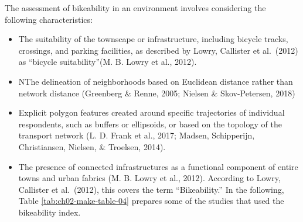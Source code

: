 \documentclass[
11pt, %
oneside, %
english, %
singlespacing, %
]{macthesis} %
\begin{document}
The assessment of bikeability in an environment involves considering the following characteristics:

\begin{itemize}
\item
  The suitability of the townscape or infrastructure, including bicycle tracks, crossings, and parking facilities, as described by Lowry, Callister et al.~(2012) as ``bicycle suitability''(M. B. Lowry et al., 2012).
\item
  NThe delineation of neighborhoods based on Euclidean distance rather than network distance (Greenberg \& Renne, 2005; Nielsen \& Skov-Petersen, 2018)
\item
  Explicit polygon features created around specific trajectories of individual respondents, such as buffers or ellipsoids, or based on the topology of the transport network (L. D. Frank et al., 2017; Madsen, Schipperijn, Christiansen, Nielsen, \& Troelsen, 2014).
\item
  The presence of connected infrastructures as a functional component of entire towns and urban fabrics (M. B. Lowry et al., 2012). According to Lowry, Callister et al.~(2012), this covers the term ``Bikeability.'' In the following, Table \ref{tab:ch02-make-table-04} prepares some of the studies that used the bikeability index.
\end{itemize}
\end{document}
